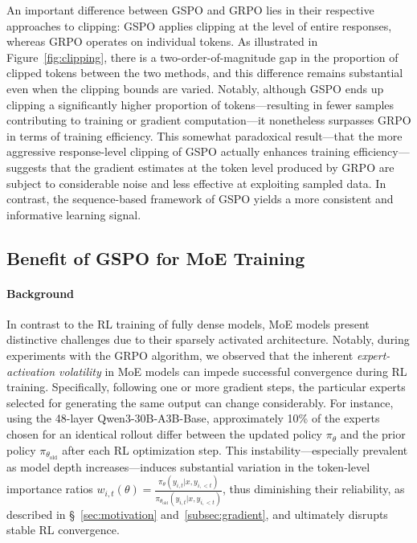 An important difference between GSPO and GRPO lies in their respective approaches to clipping: GSPO applies clipping at the level of entire responses, whereas GRPO operates on individual tokens. As illustrated in Figure~\ref{fig:clipping}, there is a two-order-of-magnitude gap in the proportion of clipped tokens between the two methods, and this difference remains substantial even when the clipping bounds are varied. Notably, although GSPO ends up clipping a significantly higher proportion of tokens—resulting in fewer samples contributing to training or gradient computation—it nonetheless surpasses GRPO in terms of training efficiency. This somewhat paradoxical result—that the more aggressive response-level clipping of GSPO actually enhances training efficiency—suggests that the gradient estimates at the token level produced by GRPO are subject to considerable noise and less effective at exploiting sampled data. In contrast, the sequence-based framework of GSPO yields a more consistent and informative learning signal.

\subsection{Benefit of GSPO for MoE Training}
\label{subsec:routing_replay}

\paragraph{Background}
In contrast to the RL training of fully dense models, MoE models present distinctive challenges due to their sparsely activated architecture. Notably, during experiments with the GRPO algorithm, we observed that the inherent \textit{expert-activation volatility} in MoE models can impede successful convergence during RL training. Specifically, following one or more gradient steps, the particular experts selected for generating the same output can change considerably. For instance, using the 48-layer Qwen3-30B-A3B-Base, approximately 10\% of the experts chosen for an identical rollout differ between the updated policy $\pi_{\theta}$ and the prior policy $\pi_{\theta_\text{old}}$ after each RL optimization step. This instability—especially prevalent as model depth increases—induces substantial variation in the token-level importance ratios $w_{i,t}(\theta) = \frac{ \pi_{\theta} (y_{i,t} | x, y_{i,<t}) }{ \pi_{\theta_\text{old}} (y_{i,t} | x,y_{i,<t})}$, thus diminishing their reliability, as described in \S~\ref{sec:motivation} and~\ref{subsec:gradient}, and ultimately disrupts stable RL convergence.

